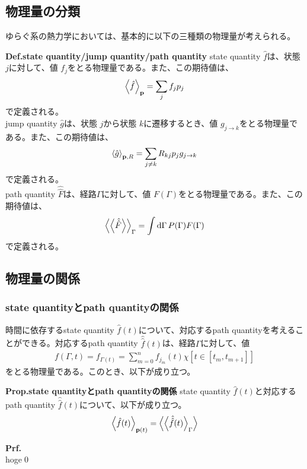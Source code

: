 \documentclass[a4paper,11pt]{jsarticle}
\numberwithin{equation}{section}
\begin{document}
\subsection{物理量の分類}
ゆらぐ系の熱力学においては、基本的に以下の三種類の物理量が考えられる。\\
\begin{itembox}[l]{\textbf{Def.state quantity/jump quantity/path quantity}}
    state quantity $\hat{f}$は、状態 $j$に対して、値 $f_j$をとる物理量である。また、この期待値は、
    \begin{align}
        \ev{\hat{f}}_{\vb{p}} = \sum_{j} f_j p_j
    \end{align}
    で定義される。\\

    jump quantity $\hat{g}$は、状態 $j$から状態 $k$に遷移するとき、値 $g_{j\to k}$をとる物理量である。また、この期待値は、
    \begin{align}
        \ev{\hat{g}}_{\vb{p},R} = \sum_{j\neq k} R_{kj} p_j g_{j\to k}
    \end{align}
    で定義される。\\

    path quantity $\hat{\hat{F}}$は、経路$\Gamma$に対して、値 $F({\Gamma})$をとる物理量である。また、この期待値は、
    \begin{align}
        \ev{\ev{\hat{\hat{F}}}}_{\Gamma} = \int \dd{\Gamma} P(\Gamma) F(\Gamma)
    \end{align}
    で定義される。
\end{itembox}

\subsection{物理量の関係}
\subsubsection{state quantityとpath quantityの関係}
時間に依存するstate quantity $\hat{f}(t)$について、対応するpath quantityを考えることができる。対応するpath quantity $\hat{\hat{f}}(t)$は、経路$\Gamma$に対して、値
\begin{align}
    f(\Gamma,t) = f_{\Gamma(t)} = \sum_{m=0}^{n} f_{j_{m}}(t) \chi[t \in [t_{m},t_{m+1}]]
\end{align}
をとる物理量である。このとき、以下が成り立つ。
\begin{itembox}[l]{\textbf{Prop.state quantityとpath quantityの関係}}
    state quantity $\hat{f}(t)$と対応するpath quantity $\hat{\hat{f}}(t)$について、以下が成り立つ。
    \begin{align}
        \ev{\hat{f}(t)}_{\vb{p}(t)} = \ev{\ev{\hat{\hat{f}}(t)}_{\Gamma}}
    \end{align}
\end{itembox}
\textbf{Prf.}\\
hoge\qed\\
\end{document}
